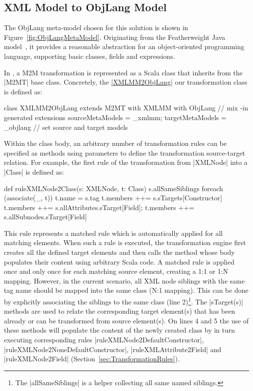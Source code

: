 \subsection{XML Model to ObjLang Model}

The ObjLang meta-model chosen for this solution is shown in Figure~\ref{fig:ObjLangMetaModel}.
Originating from the Featherweight Java model~\cite{Igarashi2001}, it provides a reasonable abstraction for an object-oriented programming language, supporting basic classes, fields and expressions.

In \SIGMA, a M2M transformation is represented as a Scala class that inherits from the \Scala|M2MT| base class.
Concretely, the \href{https://github.com/fikovnik/ttc14-fixml-sigma/blob/master/ttc14-fixml-base/src/fr/inria/spirals/sigma/ttc14/fixml/XMLMM2ObjLang.scala}{\Scala|XMLMM2ObjLang|} our transformation class is defined as:
%
\begin{scalacode}
class XMLMM2ObjLang extends M2MT with XMLMM with ObjLang { // mix -in generated extensions
  sourceMetaModels = _xmlmm; targetMetaModels = _objlang // set source and target models
}  
\end{scalacode}
%
Within the class body, an arbitrary number of transformation rules can be specified as methods using parameters to define the transformation source-target relation.
For example, the first rule of the transformation from \Scala|XMLNode| into a \Scala|Class| is defined as:
%
\begin{scalacode}
def ruleXMLNode2Class(s: XMLNode, t: Class) {
  s.allSameSiblings foreach (associate(_, t))
  t.name = s.tag
  t.members ++= s.sTargets[Constructor]
  t.members ++= s.allAttributes.sTarget[Field]; t.members ++= s.allSubnodes.sTarget[Field]
}
\end{scalacode}
%
This rule represents a matched rule which is automatically applied for all matching elements.
When such a rule is executed, the transformation engine first creates all the defined target elements and then calls the method whose body populates their content using arbitrary Scala code.
A matched rule is applied once and only once for each matching source element, creating a 1:1 or 1:N mapping.
However, in the current scenario, all XML node siblings with the same tag name should be mapped into the same class (N:1 mapping).
This can be done by explicitly associating the siblings to the same class (line 2)\footnote{The \Scala|allSameSiblings| is a helper collecting all same named siblings.}.
%
The \Scala|sTarget(s)| methods are used to relate the corresponding target element(s) that has been already or can be transformed from source element(s).
On lines 4 and 5 the use of these methods will populate the content of the newly created class by in turn executing corresponding rules \Scala|ruleXMLNode2DefaultConstructor|, \Scala|ruleXMLNode2NoneDefaultConstructor|, \Scala|ruleXMLAttribute2Field| and \Scala|ruleXMLNode2Field| (\Cf Section~\ref{sec:TransformationRules}).

